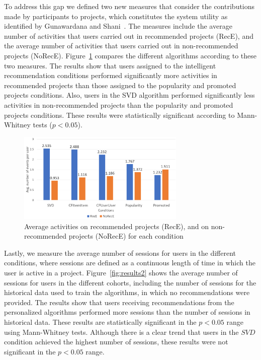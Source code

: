 \documentclass[letterpaper]{article} %
\newcommand{\kibitz}[2]{\ifnum\Comments=1{\textcolor{#1}{#2}}\fi}
\newcommand{\kg}[1]{\kibitz{red}{[KG:#1]}}
\begin{document}
To address this gap we defined two new measures that consider the contributions made by participants
to projects, which constitutes the system utility as identified by Gunawardana and Shani~\cite{gunawardana2009survey}.
 The measures include the  average number of activities that users
carried out in recommended projects (RecE), and the average number of activities that users carried out in
non-recommended projects (NoRecE). Figure~\ref{fig:results} compares the different  algorithms according to these two measures. The results show that users assigned to the intelligent recommendation conditions  performed  significantly more activities in recommended projects than those assigned to the   popularity and promoted projects conditions.
Also, users in  the SVD algorithm performed  significantly less activities  in non-recommended projects than the popularity and promoted projects conditions.
These results
were statistically significant according to Mann-Whitney tests ($p<0.05$).
\begin{figure}[t]%
     \centering
    \includegraphics[width=8cm]{Figs/results1.png}
    \caption{Average activities on recommended projects (RecE), and on non-recommended
    projects (NoRecE) for each condition}
     \label{fig:results}%
 \end{figure}

 Lastly, we measure the average number of sessions  for users in the different conditions, where sessions are defined as a  continuous length of time in which the user is active in a project.
Figure~\ref{fig:results2} shows the average number of sessions for users in the different cohorts, including the number of sessions for the historical data used to train the algorithms, in which no recommendations
were provided.
The results show that users  receiving recommendations from the personalized algorithms
performed more sessions than the number of sessions in historical data. These results are statistically significant in the $p<0.05$ range using Mann-Whitney tests.
Although there is a clear trend that users in the $SVD$ condition achieved the highest number of sessions, these results were not significant in the $p<0.05$ range.
\end{document}
